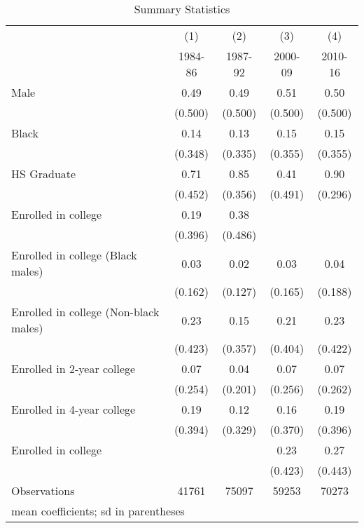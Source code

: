 \begin{table}[htbp]\centering
\caption{Summary Statistics}
\begin{tabular}{l*{4}{c}}
\hline\hline
                    &\multicolumn{1}{c}{(1)}&\multicolumn{1}{c}{(2)}&\multicolumn{1}{c}{(3)}&\multicolumn{1}{c}{(4)}\\
                    &\multicolumn{1}{c}{1984-86}&\multicolumn{1}{c}{1987-92}&\multicolumn{1}{c}{2000-09}&\multicolumn{1}{c}{2010-16}\\
\hline
Male                &        0.49&        0.49&        0.51&        0.50\\
                    &     (0.500)&     (0.500)&     (0.500)&     (0.500)\\
[1em]
Black               &        0.14&        0.13&        0.15&        0.15\\
                    &     (0.348)&     (0.335)&     (0.355)&     (0.355)\\
[1em]
HS Graduate         &        0.71&        0.85&        0.41&        0.90\\
                    &     (0.452)&     (0.356)&     (0.491)&     (0.296)\\
[1em]
Enrolled in college &        0.19&        0.38&            &            \\
                    &     (0.396)&     (0.486)&            &            \\
[1em]
Enrolled in college (Black males)&        0.03&        0.02&        0.03&        0.04\\
                    &     (0.162)&     (0.127)&     (0.165)&     (0.188)\\
[1em]
Enrolled in college (Non-black males)&        0.23&        0.15&        0.21&        0.23\\
                    &     (0.423)&     (0.357)&     (0.404)&     (0.422)\\
[1em]
Enrolled in 2-year college&        0.07&        0.04&        0.07&        0.07\\
                    &     (0.254)&     (0.201)&     (0.256)&     (0.262)\\
[1em]
Enrolled in 4-year college&        0.19&        0.12&        0.16&        0.19\\
                    &     (0.394)&     (0.329)&     (0.370)&     (0.396)\\
[1em]
Enrolled in college &            &            &        0.23&        0.27\\
                    &            &            &     (0.423)&     (0.443)\\
\hline
Observations        &       41761&       75097&       59253&       70273\\
\hline\hline
\multicolumn{5}{l}{\footnotesize mean coefficients; sd in parentheses}\\
\end{tabular}
\end{table}
